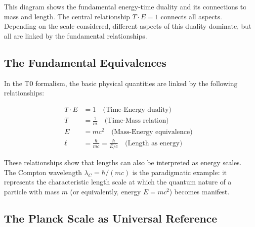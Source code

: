 \begin{center}
	\end{center}
	
	This diagram shows the fundamental energy-time duality and its connections to mass and length. The central relationship $T \cdot E = 1$ connects all aspects. Depending on the scale considered, different aspects of this duality dominate, but all are linked by the fundamental relationships.
	
	\subsection{The Fundamental Equivalences}
	
	In the T0 formalism, the basic physical quantities are linked by the following relationships:
	
	\begin{align}
		T \cdot E &= 1 \quad \text{(Time-Energy duality)} \\
		T &= \frac{1}{m} \quad \text{(Time-Mass relation)} \\
		E &= mc^2 \quad \text{(Mass-Energy equivalence)} \\
		\ell &= \frac{\hbar}{mc} = \frac{\hbar}{E/c} \quad \text{(Length as energy)}
	\end{align}
	
	These relationships show that lengths can also be interpreted as energy scales. The Compton wavelength $\lambda_C = \hbar/(mc)$ is the paradigmatic example: it represents the characteristic length scale at which the quantum nature of a particle with mass $m$ (or equivalently, energy $E = mc^2$) becomes manifest.
	
	\subsection{The Planck Scale as Universal Reference}
	
